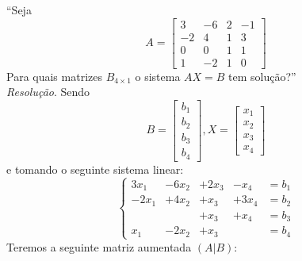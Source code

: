 \enquote{Seja
\begin{displaymath}
    A = \left[\begin{array}{cccc}
         3& -6 & 2 & -1  \\
         -2 & 4 & 1 & 3 \\
         0 & 0 & 1 & 1 \\
         1 & -2 & 1 & 0 
    \end{array}\right]
\end{displaymath} 
Para quais matrizes $B_{4\times1}$ o sistema $AX = B$ tem solução?}
\\ 
\emph{Resolução}. Sendo
\begin{displaymath}
    B = \left[\begin{array}{c}
         b_1 \\
         b_2 \\
         b_3 \\
         b_4
    \end{array}\right],
    X = \left[\begin{array}{c}
         x_1 \\
         x_2 \\
         x_3 \\
         x_4
    \end{array}\right]
\end{displaymath}
e tomando o seguinte sistema linear:
\begin{displaymath}
    \left\{\begin{array}{ccccc}
         3x_1&- 6x_2 &+ 2x_3 &- x_4 & =b_1  \\
         -2x_1 &+ 4x_2 &+ x_3 &+ 3x_4 & =b_2\\
            & &+ x_3 &+ x_4 & =b_3\\
         x_1 &- 2x_2 &+ x_3 & & = b_4
    \end{array}\right.
\end{displaymath}
Teremos a seguinte matriz aumentada $(A|B)$:
